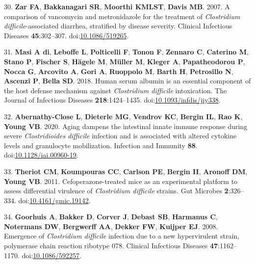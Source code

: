 \documentclass[
  12pt,
]{article}
\newenvironment{cslreferences}%
  {}%
  {\par}
\begin{document}
\begin{cslreferences}
\leavevmode\hypertarget{ref-Zar2007}{}%
30. \textbf{Zar FA}, \textbf{Bakkanagari SR}, \textbf{Moorthi KMLST},
\textbf{Davis MB}. 2007. A comparison of vancomycin and metronidazole
for the treatment of \emph{Clostridium difficile}-associated diarrhea,
stratified by disease severity. Clinical Infectious Diseases
\textbf{45}:302--307.
doi:\href{https://doi.org/10.1086/519265}{10.1086/519265}.

\leavevmode\hypertarget{ref-diMasi2018}{}%
31. \textbf{Masi A di}, \textbf{Leboffe L}, \textbf{Polticelli F},
\textbf{Tonon F}, \textbf{Zennaro C}, \textbf{Caterino M}, \textbf{Stano
P}, \textbf{Fischer S}, \textbf{Hägele M}, \textbf{Müller M},
\textbf{Kleger A}, \textbf{Papatheodorou P}, \textbf{Nocca G},
\textbf{Arcovito A}, \textbf{Gori A}, \textbf{Ruoppolo M}, \textbf{Barth
H}, \textbf{Petrosillo N}, \textbf{Ascenzi P}, \textbf{Bella SD}. 2018.
Human serum albumin is an essential component of the host defense
mechanism against \emph{Clostridium difficile} intoxication. The Journal
of Infectious Diseases \textbf{218}:1424--1435.
doi:\href{https://doi.org/10.1093/infdis/jiy338}{10.1093/infdis/jiy338}.

\leavevmode\hypertarget{ref-AbernathyClose2020}{}%
32. \textbf{Abernathy-Close L}, \textbf{Dieterle MG}, \textbf{Vendrov
KC}, \textbf{Bergin IL}, \textbf{Rao K}, \textbf{Young VB}. 2020. Aging
dampens the intestinal innate immune response during severe
\emph{Clostridioides difficile} infection and is associated with altered
cytokine levels and granulocyte mobilization. Infection and Immunity
\textbf{88}.
doi:\href{https://doi.org/10.1128/iai.00960-19}{10.1128/iai.00960-19}.

\leavevmode\hypertarget{ref-Theriot2011}{}%
33. \textbf{Theriot CM}, \textbf{Koumpouras CC}, \textbf{Carlson PE},
\textbf{Bergin II}, \textbf{Aronoff DM}, \textbf{Young VB}. 2011.
Cefoperazone-treated mice as an experimental platform to assess
differential virulence of \emph{Clostridium difficile} strains. Gut
Microbes \textbf{2}:326--334.
doi:\href{https://doi.org/10.4161/gmic.19142}{10.4161/gmic.19142}.

\leavevmode\hypertarget{ref-Goorhuis2008}{}%
34. \textbf{Goorhuis A}, \textbf{Bakker D}, \textbf{Corver J},
\textbf{Debast SB}, \textbf{Harmanus C}, \textbf{Notermans DW},
\textbf{Bergwerff AA}, \textbf{Dekker FW}, \textbf{Kuijper EJ}. 2008.
Emergence of \emph{Clostridium difficile} infection due to a new
hypervirulent strain, polymerase chain reaction ribotype 078. Clinical
Infectious Diseases \textbf{47}:1162--1170.
doi:\href{https://doi.org/10.1086/592257}{10.1086/592257}.


\end{cslreferences}
\end{document}
